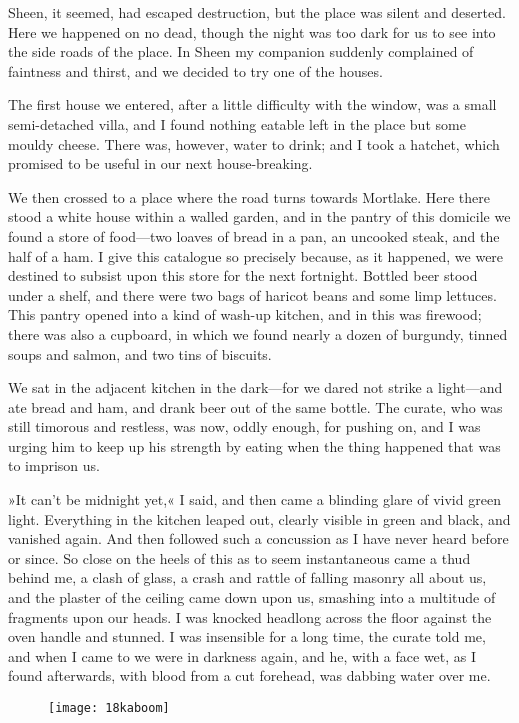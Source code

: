 Sheen, it seemed, had escaped destruction, but the place was silent and deserted. Here we happened on no dead, though the night was too dark for us to see into the side roads of the place. In Sheen my companion suddenly complained of faintness and thirst, and we decided to try one of the houses.

The first house we entered, after a little difficulty with the window, was a small semi-detached villa, and I found nothing eatable left in the place but some mouldy cheese. There was, however, water to drink; and I took a hatchet, which promised to be useful in our next house-breaking.

We then crossed to a place where the road turns towards Mortlake. Here there stood a white house within a walled garden, and in the pantry of this domicile we found a store of food—two loaves of bread in a pan, an uncooked steak, and the half of a ham. I give this catalogue so precisely because, as it happened, we were destined to subsist upon this store for the next fortnight. Bottled beer stood under a shelf, and there were two bags of haricot beans and some limp lettuces. This pantry opened into a kind of wash-up kitchen, and in this was firewood; there was also a cupboard, in which we found nearly a dozen of burgundy, tinned soups and salmon, and two tins of biscuits.

We sat in the adjacent kitchen in the dark—for we dared not strike a light—and ate bread and ham, and drank beer out of the same bottle. The curate, who was still timorous and restless, was now, oddly enough, for pushing on, and I was urging him to keep up his strength by eating when the thing happened that was to imprison us.

»It can't be midnight yet,« I said, and then came a blinding glare of vivid green light. Everything in the kitchen leaped out, clearly visible in green and black, and vanished again. And then followed such a concussion as I have never heard before or since. So close on the heels of this as to seem instantaneous came a thud behind me, a clash of glass, a crash and rattle of falling masonry all about us, and the plaster of the ceiling came down upon us, smashing into a multitude of fragments upon our heads. I was knocked headlong across the floor against the oven handle and stunned. I was insensible for a long time, the curate told me, and when I came to we were in darkness again, and he, with a face wet, as I found afterwards, with blood from a cut forehead, was dabbing water over me.

\begin{figure}[tb!]
\centering
\texttt{[image: 18kaboom]}
\end{figure}

